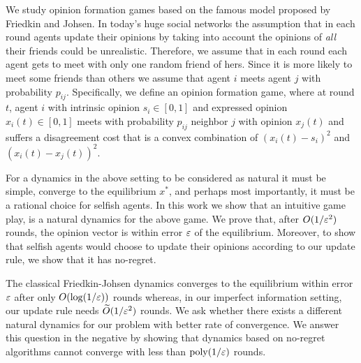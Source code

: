 We study opinion formation games based on the famous model proposed by Friedkin
and Johsen.  In today's huge social networks the assumption that in each round
agents update their opinions by taking into account the opinions of
\emph{all} their friends could be unrealistic. Therefore, we assume that in
each round each agent gets to meet with only one random friend of
hers.  Since it is more likely to meet some friends than others we assume
that agent $i$ meets agent $j$ with probability $p_{ij}$.
Specifically, we define an opinion formation game, where at round $t$,
agent $i$ with intrinsic opinion $s_i\in[0,1]$ and expressed opinion $x_i(t)
\in[0,1]$ meets with probability $p_{ij}$ neighbor $j$ with opinion $x_j(t)$
and suffers a disagreement cost that is a convex combination of
$(x_i(t) - s_i)^2$ and $(x_i(t) - x_j(t))^2$.


For a dynamics in the above setting to be considered as natural it must be
simple, converge to the equilibrium $x^*$, and perhaps most importantly, it
must be a rational choice for selfish agents.  In this work we show that
an intuitive game play, is a natural dynamics for the above game.
We prove that, after $O(1/\varepsilon^2)$ rounds, the opinion vector
is within error $\varepsilon$  of the equilibrium. Moreover, to show that selfish
agents would choose to update their opinions according to our update rule,
we show that it has no-regret.


The classical Friedkin-Johsen dynamics converges to the equilibrium within
error $\varepsilon$ after only $O(\log(1/\varepsilon))$ rounds whereas, in our imperfect
information setting, our update rule needs $\widetilde{O}(1/\varepsilon^2)$ rounds.
We ask whether there exists a different natural dynamics for our problem
with better rate of convergence.  We answer this question in the negative
by showing that dynamics based on no-regret algorithms cannot converge with
less than $\mathrm{poly}(1/\varepsilon)$ rounds.
